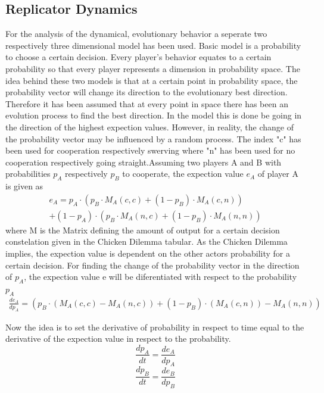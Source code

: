 \documentclass[11pt]{article}
\begin{document}
\subsection{Replicator Dynamics}
For the analysis of the dynamical, evolutionary behavior a seperate two respectively three dimensional model has been used. Basic model is a probability to choose a certain decision. Every player's behavior equates to a certain probability so that every player represents a dimension in probability space. The idea behind these two models is that at a certain point in probability space, the probability vector will change its direction to the evolutionary best direction. Therefore it has been assumed that at every point in space there has been an evolution process to find the best direction. In the model this is done be going in the direction of the highest expection values. However, in reality, the change of the probability vector may be influenced by a random process.
\newline
The index "c" has been used for cooperation respectively swerving where "n" has been used for no cooperation respectively going straight.Assuming two players A and B with probabilities $p_A$ respectively $p_B$ to cooperate, the expection value $e_A$ of player A is given as 
\begin{equation}
\begin{split}
 e_A = p_A \cdot (p_B \cdot M_A(c,c) + (1 - p_B) \cdot M_A(c,n)) \\ 
+  (1 - p_A) \cdot (p_B \cdot M_A(n,c) + (1 - p_B) \cdot M_A(n,n))
\end{split}
\end{equation}
where M is the Matrix defining the amount of output for a certain decision constelation given in the Chicken Dilemma tabular.
As the Chicken Dilemma implies, the expection value is dependent on the other actors probability for a certain decision.
For finding the change of the probability vector in the direction of $p_A$, the expection value e will be diferentiated with respect to the probability $p_A$
\begin{equation}
\begin{split}
\frac{d e_A}{d p_A} = (p_B \cdot (M_A(c,c) - M_A(n,c))  + (1 - p_B) \cdot (M_A(c,n)) - M_A(n,n))  
\end{split}
\label{edot}
\end{equation}

Now the idea is to set the derivative of probability in respect to time equal to the derivative of the expection value in respect to the probability.
\begin{equation}
\frac{d p_A}{dt} = \frac{d e_A}{d p_A}
\end{equation}
\begin{equation}
\frac{d p_B}{dt} = \frac{d e_B}{d p_B}
\end{equation}
\end{document}
